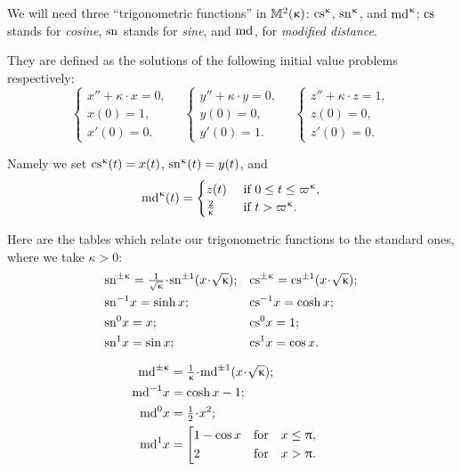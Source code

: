 We will need three ``trigonometric functions'' in $\mathbb{M}_{{}}^{2}({\upkappa})$: $\cs\kappa$, $\sn\kappa$, and $\md\kappa$;
$\mathrm{cs}^{}$ stands for {}\emph{cosine}, $\mathrm{sn}^{}$ stands for {}\emph{sine}, and $\mathrm{md}^{}$, for {}\emph{modified distance}. 

They are defined as the solutions of the following initial value problems respectively:
\[
\begin{cases}
 x''+\kappa\cdot x=0,\\
 x(0)=1,\\
 x'(0)=0.
 \end{cases} 
  \quad 
 \begin{cases}
 y''+\kappa\cdot y=0,\\
 y(0)=0,\\
 y'(0)=1.
 \end{cases} 
\quad
 \begin{cases}
 z''+\kappa\cdot z=1,\\
 z(0)=0,\\
 z'(0)=0.
 \end{cases}  
\]

Namely we set $\mathrm{cs}^{\upkappa}(t)=x(t)$, $\mathrm{sn}^{\upkappa}(t)=y(t)$, and 
\[
\md\kappa(t)=
\begin{cases}
z(t)& \textrm{ if } 0\le t\le \varpi\kappa,
\\
\tfrac{2}{\kappa}& \textrm{ if  } t> \varpi\kappa.
\end{cases}
\]

Here are the tables which relate our trigonometric functions to the standard ones, where 
we take $\kappa>0$:\index{$\md\kappa$}\index{$\sn\kappa$}\index{$\cs\kappa$}
\begin{align*}
&\sn{\pm\kappa}=\tfrac{1}{\sqrt{\kappa}}\cdot \sn{\pm1}({x}\cdot {\sqrt{\kappa}});
&&\cs{\pm\kappa}=\cs{\pm1}({x}\cdot {\sqrt{\kappa}});
\\
&\sn{-1} x=\sinh x;&&\cs{-1} x=\cosh x;\\
&\sn{0} x=x;
&&\cs{0} x=1;\\
&\sn{1} x=\sin x;	&&\cs{1} x= \cos x.
\end{align*}
	
\begin{align*}
\md{\pm\kappa}
&=
\tfrac{1}{\kappa}\cdot \md{\pm1}({x}\cdot {\sqrt{\kappa}});
\\
\md{-1} x&=\cosh x-1;
\\
\md{0} x&=\tfrac{1}{2}\cdot x^2; 
\\
\md{1} x
&=
\left[
\begin{aligned}
&1-\cos x&&\text{for}&&x\le \pi,
\\
&2&&\text{for}&&x >\pi.
\end{aligned}
\right.	&
\end{align*}

